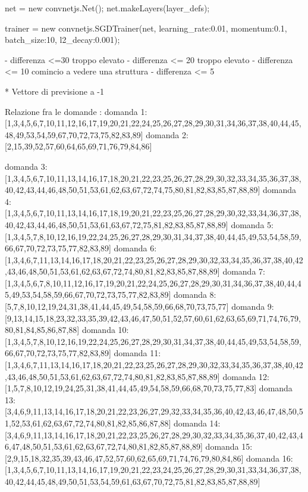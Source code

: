 net = new convnetjs.Net();
net.makeLayers(layer_defs);

trainer = new convnetjs.SGDTrainer(net, {learning_rate:0.01, momentum:0.1, batch_size:10, l2_decay:0.001});

- differenza <=30 troppo elevato
- differenza <= 20 troppo elevato
- differenza <= 10 comincio a vedere una struttura
- differenza <= 5

* Vettore di previsione a -1

Relazione fra le domande :
domanda 1:[1,3,4,5,6,7,10,11,12,16,17,19,20,21,22,24,25,26,27,28,29,30,31,34,36,37,38,40,44,45,48,49,53,54,59,67,70,72,73,75,82,83,89]
domanda 2:[2,15,39,52,57,60,64,65,69,71,76,79,84,86]

domanda 3:[1,3,4,5,6,7,10,11,13,14,16,17,18,20,21,22,23,25,26,27,28,29,30,32,33,34,35,36,37,38,40,42,43,44,46,48,50,51,53,61,62,63,67,72,74,75,80,81,82,83,85,87,88,89]
domanda 4:[1,3,4,5,6,7,10,11,13,14,16,17,18,19,20,21,22,23,25,26,27,28,29,30,32,33,34,36,37,38,40,42,43,44,46,48,50,51,53,61,63,67,72,75,81,82,83,85,87,88,89]
domanda 5:[1,3,4,5,7,8,10,12,16,19,22,24,25,26,27,28,29,30,31,34,37,38,40,44,45,49,53,54,58,59,66,67,70,72,73,75,77,82,83,89]
domanda 6:[1,3,4,6,7,11,13,14,16,17,18,20,21,22,23,25,26,27,28,29,30,32,33,34,35,36,37,38,40,42,43,46,48,50,51,53,61,62,63,67,72,74,80,81,82,83,85,87,88,89]
domanda 7:[1,3,4,5,6,7,8,10,11,12,16,17,19,20,21,22,24,25,26,27,28,29,30,31,34,36,37,38,40,44,45,49,53,54,58,59,66,67,70,72,73,75,77,82,83,89]
domanda 8:[5,7,8,10,12,19,24,31,38,41,44,45,49,54,58,59,66,68,70,73,75,77]
domanda 9:[9,13,14,15,18,23,32,33,35,39,42,43,46,47,50,51,52,57,60,61,62,63,65,69,71,74,76,79,80,81,84,85,86,87,88]
domanda 10:[1,3,4,5,7,8,10,12,16,19,22,24,25,26,27,28,29,30,31,34,37,38,40,44,45,49,53,54,58,59,66,67,70,72,73,75,77,82,83,89]
domanda 11:[1,3,4,6,7,11,13,14,16,17,18,20,21,22,23,25,26,27,28,29,30,32,33,34,35,36,37,38,40,42,43,46,48,50,51,53,61,62,63,67,72,74,80,81,82,83,85,87,88,89]
domanda 12:[1,5,7,8,10,12,19,24,25,31,38,41,44,45,49,54,58,59,66,68,70,73,75,77,83]
domanda 13:[3,4,6,9,11,13,14,16,17,18,20,21,22,23,26,27,29,32,33,34,35,36,40,42,43,46,47,48,50,51,52,53,61,62,63,67,72,74,80,81,82,85,86,87,88]
domanda 14:[3,4,6,9,11,13,14,16,17,18,20,21,22,23,25,26,27,28,29,30,32,33,34,35,36,37,40,42,43,46,47,48,50,51,53,61,62,63,67,72,74,80,81,82,85,87,88,89]
domanda 15:[2,9,15,18,32,35,39,43,46,47,52,57,60,62,65,69,71,74,76,79,80,84,86]
domanda 16:[1,3,4,5,6,7,10,11,13,14,16,17,19,20,21,22,23,24,25,26,27,28,29,30,31,33,34,36,37,38,40,42,44,45,48,49,50,51,53,54,59,61,63,67,70,72,75,81,82,83,85,87,88,89]
